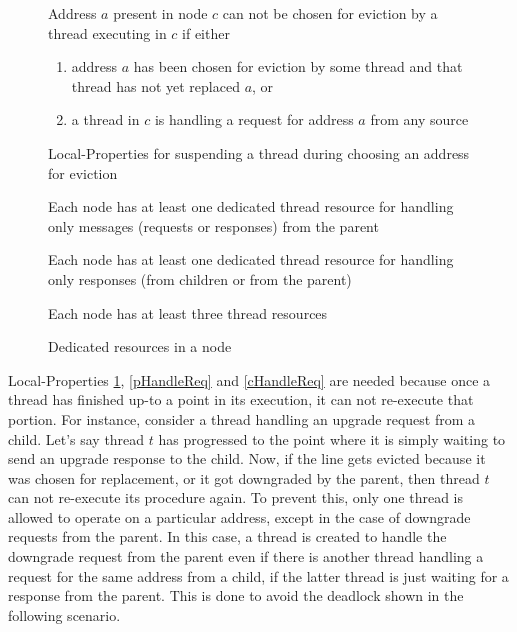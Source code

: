 \begin{figure}\small
\begin{inv}
Address $a$ present in node $c$ can not be chosen for eviction by a thread
executing in $c$ if either
\begin{enumerate}
\item address $a$ has been chosen for eviction by some thread and that thread
has not yet replaced $a$, or
\item a thread in $c$ is handling a request for address
$a$ from any source
\end{enumerate}\label{evict}
\caption{Local-Properties for suspending a thread during choosing an address for eviction}
\end{inv}
\end{figure}

\begin{figure}\small
\begin{inv}
Each node has at least one dedicated thread resource for handling only messages
(requests or responses) from the parent\label{dedicate1}
\end{inv}
\begin{inv}
Each node has at least one dedicated thread resource for handling only responses
(from children or from the parent)\label{dedicate2}
\end{inv}
\begin{inv}
Each node has at least three thread resources\label{dedicate3}
\end{inv}
\caption{Dedicated resources in a node}
\end{figure}

Local-Properties \ref{evict}, \ref{pHandleReq} and \ref{cHandleReq} are needed
because once a thread has finished up-to a point in its execution, it can not
re-execute that portion. For instance, consider a thread handling an upgrade
request from a child. Let's say thread $t$ has progressed to the point where it
is simply waiting to send an upgrade response to the child. Now, if the line
gets evicted because it was chosen for replacement, or it got downgraded by the
parent, then thread $t$ can not re-execute its procedure again. To prevent this,
only one thread is allowed to operate on a particular address, except in the
case of downgrade requests from the parent. In this case, a thread is created to
handle the downgrade request from the parent even if there is another thread
handling a request for the same address from a child, if the latter thread is
just waiting for a response from the parent. This is done to avoid the deadlock
shown in the following scenario.

